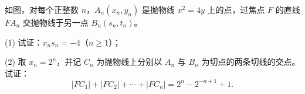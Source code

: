 \begin{question}
如图，对每个正整数 \(n\)，\(A_n(x_n,y_n)\) 是抛物线 \(x^2=4y\) 上的点，过焦点 \(F\) 的直线 \(FA_n\) 交抛物线于另一点 \(B_n(s_n,t_n)\)。

(1) 试证：\(x_ns_n=-4\)（\(n\geqslant1\)）；

(2) 取 \(x_n=2^n\)，并记 \(C_n\) 为抛物线上分别以 \(A_n\) 与 \(B_n\) 为切点的两条切线的交点。试证：
\nopagebreak[4]
\[
|FC_1|+|FC_2|+\cdots+|FC_n|=2^n-2^{-n+1}+1.
\]
\nopagebreak[4]
\begin{center}\end{center}
\nopagebreak[4]

\end{question}